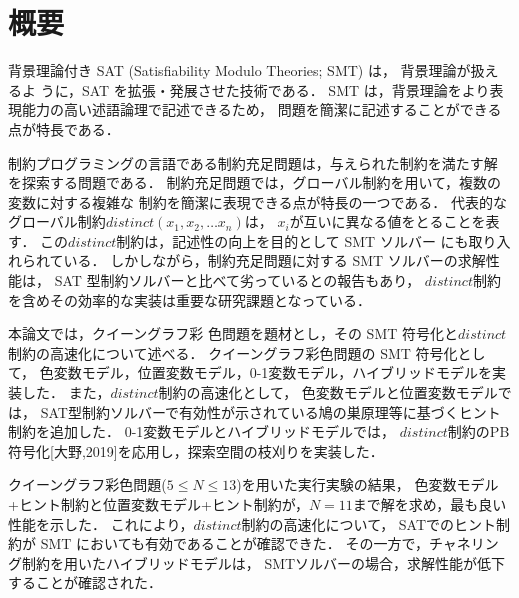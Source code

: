 \chapter*{概要}


%
背景理論付き SAT (Satisfiability Modulo Theories; SMT) は，
背景理論が扱えるよ
うに，SAT を拡張・発展させた技術である．
SMT は，背景理論をより表現能力の高い述語論理で記述できるため，
問題を簡潔に記述することができる点が特長である．

制約プログラミングの言語である制約充足問題は，与えられた制約を満たす解
を探索する問題である．
制約充足問題では，グローバル制約を用いて，複数の変数に対する複雑な
制約を簡潔に表現できる点が特長の一つである．
代表的なグローバル制約$distinct(x_{1},x_{2},\ldots x_{n})$は，
$x_{i}$が互いに異なる値をとることを表す．
この$distinct$制約は，記述性の向上を目的として SMT ソルバー
にも取り入れられている．
しかしながら，制約充足問題に対する SMT ソルバーの求解性能は，
SAT 型制約ソルバーと比べて劣っているとの報告もあり，
$distinct$制約を含めその効率的な実装は重要な研究課題となっている．

本論文では，クイーングラフ彩
色問題を題材とし，その SMT 符号化と$distinct$制約の高速化について述べる．
クイーングラフ彩色問題の SMT 符号化として，
色変数モデル，位置変数モデル，0-1変数モデル，ハイブリッドモデルを実装した．
また，$distinct$制約の高速化として，
色変数モデルと位置変数モデルでは，
SAT型制約ソルバーで有効性が示されている鳩の巣原理等に基づくヒント制約を追加した．
0-1変数モデルとハイブリッドモデルでは，
$distinct$制約のPB符号化[大野,2019]を応用し，探索空間の枝刈りを実装した．

クイーングラフ彩色問題($5\leq N \leq 13$)を用いた実行実験の結果，
色変数モデル+ヒント制約と位置変数モデル+ヒント制約が，$N=11$まで解を求め，最も良い性能を示した．
これにより，$distinct$制約の高速化について，
SATでのヒント制約が SMT においても有効であることが確認できた．
その一方で，チャネリング制約を用いたハイブリッドモデルは，
SMTソルバーの場合，求解性能が低下することが確認された．


